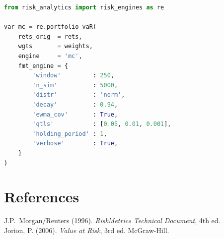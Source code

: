 \documentclass[11pt, a4paper]{article}
\begin{document}
\begin{lstlisting}[language=Python]
from risk_analytics import risk_engines as re

var_mc = re.portfolio_vaR(
    rets_orig  = rets,
    wgts       = weights,
    engine     = 'mc',
    fmt_engine = {
        'window'         : 250,
        'n_sim'          : 5000,
        'distr'          : 'norm',
        'decay'          : 0.94,
        'ewma_cov'       : True,
        'qtls'           : [0.05, 0.01, 0.001],
        'holding_period' : 1,
        'verbose'        : True,
    }
)
\end{lstlisting}

\section{References}

J.P.\ Morgan/Reuters (1996). \textit{RiskMetrics Technical Document}, 4th ed.\\
Jorion, P. (2006). \textit{Value at Risk}, 3rd ed. McGraw-Hill.
\end{document}

